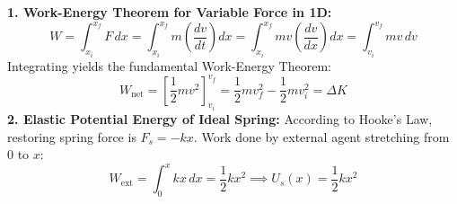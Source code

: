 \documentclass[10pt,a4paper]{article}
\begin{document}
\begin{formulabox}
\textbf{1. Work-Energy Theorem for Variable Force in 1D:}
\begin{equation}
  W = \int_{x_i}^{x_f} F\,dx = \int_{x_i}^{x_f} m\left(\frac{dv}{dt}\right)dx = \int_{x_i}^{x_f} m v\left(\frac{dv}{dx}\right)dx = \int_{v_i}^{v_f} m v\,dv
\end{equation}
Integrating yields the fundamental Work-Energy Theorem:
\begin{equation}
  W_{\text{net}} = \left[\frac{1}{2}m v^2\right]_{v_i}^{v_f} = \frac{1}{2}m v_f^2 - \frac{1}{2}m v_i^2 = \Delta K
\end{equation}
\textbf{2. Elastic Potential Energy of Ideal Spring:}
According to Hooke's Law, restoring spring force is $F_s = -kx$. Work done by external agent stretching from $0$ to $x$:
\begin{equation}
  W_{\text{ext}} = \int_{0}^{x} kx\,dx = \frac{1}{2}kx^2 \implies U_s(x) = \frac{1}{2}kx^2
\end{equation}
\end{formulabox}
\end{document}
